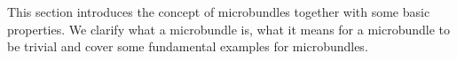 \begin{myparagraph}
    This section introduces the concept of microbundles
    together with some basic properties.
    We clarify what a microbundle is, what it means for a microbundle to be trivial and 
    cover some fundamental examples for microbundles.
\end{myparagraph}





